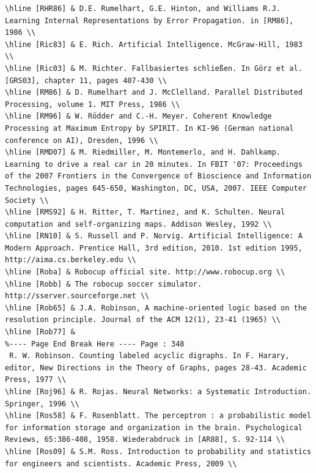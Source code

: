 \documentclass[10pt]{article}
\begin{document}
\begin{verbatim}
\hline [RHR86] & D.E. Rumelhart, G.E. Hinton, and Williams R.J. Learning Internal Representations by Error Propagation. in [RM86], 1986 \\
\hline [Ric83] & E. Rich. Artificial Intelligence. McGraw-Hill, 1983 \\
\hline [Ric03] & M. Richter. Fallbasiertes schließen. In Görz et al. [GRS03], chapter 11, pages 407-430 \\
\hline [RM86] & D. Rumelhart and J. McClelland. Parallel Distributed Processing, volume 1. MIT Press, 1986 \\
\hline [RM96] & W. Rödder and C.-H. Meyer. Coherent Knowledge Processing at Maximum Entropy by SPIRIT. In KI-96 (German national conference on AI), Dresden, 1996 \\
\hline [RMD07] & M. Riedmiller, M. Montemerlo, and H. Dahlkamp. Learning to drive a real car in 20 minutes. In FBIT '07: Proceedings of the 2007 Frontiers in the Convergence of Bioscience and Information Technologies, pages 645-650, Washington, DC, USA, 2007. IEEE Computer Society \\
\hline [RMS92] & H. Ritter, T. Martinez, and K. Schulten. Neural computation and self-organizing maps. Addison Wesley, 1992 \\
\hline [RN10] & S. Russell and P. Norvig. Artificial Intelligence: A Modern Approach. Prentice Hall, 3rd edition, 2010. 1st edition 1995, http://aima.cs.berkeley.edu \\
\hline [Roba] & Robocup official site. http://www.robocup.org \\
\hline [Robb] & The robocup soccer simulator. http://sserver.sourceforge.net \\
\hline [Rob65] & J.A. Robinson, A machine-oriented logic based on the resolution principle. Journal of the ACM 12(1), 23-41 (1965) \\
\hline [Rob77] &
%---- Page End Break Here ---- Page : 348
 R. W. Robinson. Counting labeled acyclic digraphs. In F. Harary, editor, New Directions in the Theory of Graphs, pages 28-43. Academic Press, 1977 \\
\hline [Roj96] & R. Rojas. Neural Networks: a Systematic Introduction. Springer, 1996 \\
\hline [Ros58] & F. Rosenblatt. The perceptron : a probabilistic model for information storage and organization in the brain. Psychological Reviews, 65:386-408, 1958. Wiederabdruck in [AR88], S. 92-114 \\
\hline [Ros09] & S.M. Ross. Introduction to probability and statistics for engineers and scientists. Academic Press, 2009 \\

\end{verbatim}
\end{document}

